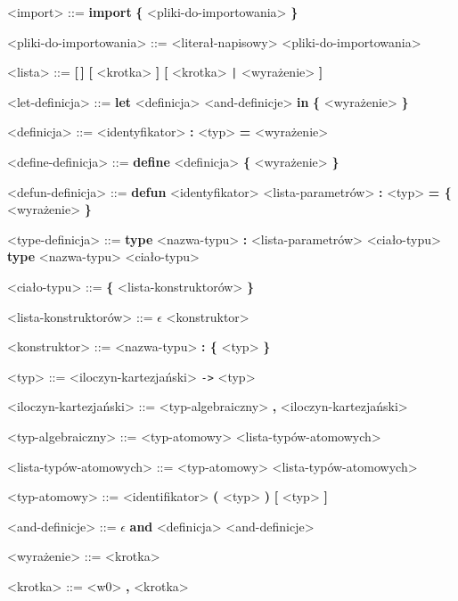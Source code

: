 \documentclass[12pt]{article}
\begin{document}
\begin{grammar}
<import> ::=
    \textbf{import} \textbf{\{} <pliki-do-importowania> \textbf{\}}

<pliki-do-importowania> ::=
    <literał-napisowy>
     <pliki-do-importowania>

<lista> ::=
    \textbf{[\,]}
    \alt \textbf{[} <krotka> \textbf{]}
    \alt \textbf{[} <krotka> \texttt{|} <wyrażenie> \textbf{]}

<let-definicja> ::=
    \textbf{let} <definicja> <and-definicje>
    \textbf{in} \textbf{\{} <wyrażenie> \textbf{\}} 

<definicja> ::=
    <identyfikator> \textbf{:} <typ> \textbf{=} <wyrażenie>

<define-definicja> ::=
    \textbf{define} <definicja> \textbf{\{} <wyrażenie> \textbf{\}}

<defun-definicja> ::=
    \textbf{defun} <identyfikator> <lista-parametrów> \textbf{:} <typ> 
    \textbf{= \{} <wyrażenie> \textbf{\}}

<type-definicja> ::=
    \textbf{type} <nazwa-typu> 
    \textbf{:} <lista-parametrów> <ciało-typu>
    \alt \textbf{type} <nazwa-typu> <ciało-typu>

<ciało-typu> ::= 
    \textbf{\{} <lista-konstruktorów> \textbf{\}}

<lista-konstruktorów> ::=
    $\epsilon$
     <konstruktor>

<konstruktor> ::=
    <nazwa-typu>
     \textbf{: \{} <typ> \textbf{\}}

<typ> ::= 
    <iloczyn-kartezjański>
     \texttt{->} <typ>

<iloczyn-kartezjański> ::=
    <typ-algebraiczny>
     \textbf{,} <iloczyn-kartezjański>

<typ-algebraiczny> ::=
    <typ-atomowy>
     <lista-typów-atomowych>

<lista-typów-atomowych> ::=
    <typ-atomowy>
     <lista-typów-atomowych>

<typ-atomowy> ::=
    <identifikator>
    \alt \textbf{(} <typ> \textbf{)}
    \alt \textbf{[} <typ> \textbf{]}

<and-definicje> ::=
    $\epsilon$
    \alt \textbf{and} <definicja> <and-definicje>

<wyrażenie> ::=
    <krotka>

<krotka> ::=
    <w0>
     \textbf{,} <krotka>


\end{grammar}
\end{document}
